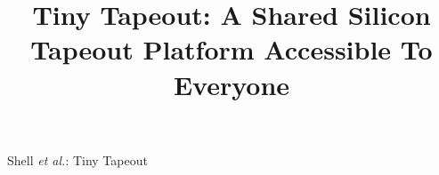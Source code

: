 \documentclass[journal]{IEEEtran}
\begin{document}

\title{Tiny Tapeout: A Shared Silicon Tapeout Platform Accessible To Everyone}



%
{Shell \MakeLowercase{\textit{et al.}}: Tiny Tapeout}


\maketitle



%
%
%
%
%
%
%
%
%














%






\end{document}
